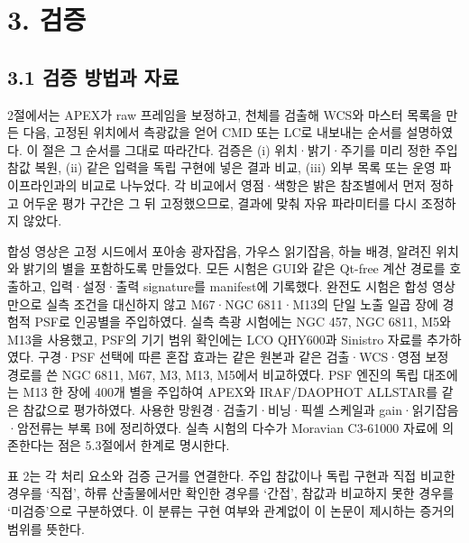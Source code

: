 \section{3. 검증}

\subsection{3.1 검증 방법과 자료}

2절에서는 APEX가 raw 프레임을 보정하고, 천체를 검출해 WCS와 마스터 목록을 만든 다음, 고정된 위치에서 측광값을 얻어 CMD 또는 LC로 내보내는 순서를 설명하였다. 이 절은 그 순서를 그대로 따라간다. 검증은 (i) 위치·밝기·주기를 미리 정한 주입 참값 복원, (ii) 같은 입력을 독립 구현에 넣은 결과 비교, (iii) 외부 목록 또는 운영 파이프라인과의 비교로 나누었다. 각 비교에서 영점·색항은 밝은 참조별에서 먼저 정하고 어두운 평가 구간은 그 뒤 고정했으므로, 결과에 맞춰 자유 파라미터를 다시 조정하지 않았다.



합성 영상은 고정 시드에서 포아송 광자잡음, 가우스 읽기잡음, 하늘 배경, 알려진 위치와 밝기의 별을 포함하도록 만들었다. 모든 시험은 GUI와 같은 Qt-free 계산 경로를 호출하고, 입력·설정·출력 signature를 manifest에 기록했다. 완전도 시험은 합성 영상만으로 실측 조건을 대신하지 않고 M67·NGC 6811·M13의 단일 노출 일곱 장에 경험적 PSF로 인공별을 주입하였다. 실측 측광 시험에는 NGC 457, NGC 6811, M5와 M13을 사용했고, PSF의 기기 범위 확인에는 LCO QHY600과 Sinistro 자료를 추가하였다. 구경·PSF 선택에 따른 혼잡 효과는 같은 원본과 같은 검출·WCS·영점 보정 경로를 쓴 NGC 6811, M67, M3, M13, M5에서 비교하였다. PSF 엔진의 독립 대조에는 M13 한 장에 400개 별을 주입하여 APEX와 IRAF/DAOPHOT ALLSTAR를 같은 참값으로 평가하였다. 사용한 망원경·검출기·비닝·픽셀 스케일과 gain·읽기잡음·암전류는 부록 B에 정리하였다. 실측 시험의 다수가 Moravian C3-61000 자료에 의존한다는 점은 5.3절에서 한계로 명시한다.



표 2는 각 처리 요소와 검증 근거를 연결한다. 주입 참값이나 독립 구현과 직접 비교한 경우를 ‘직접’, 하류 산출물에서만 확인한 경우를 ‘간접’, 참값과 비교하지 못한 경우를 ‘미검증’으로 구분하였다. 이 분류는 구현 여부와 관계없이 이 논문이 제시하는 증거의 범위를 뜻한다.



